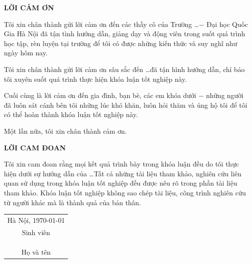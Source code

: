 \documentclass{uet}
\begin{document}
\pagebreak


\begin{titlepage}
    \begin{center}
        \bf{LỜI CẢM ƠN}
    \end{center}

    \par Tôi xin chân thành gửi lời cảm ơn đến các thầy cô của Trường \ldots $-$ Đại học Quốc Gia Hà Nội đã tận tình hướng dẫn, giảng dạy và động viên trong suốt quá trình học tập, rèn luyện tại trường để tôi có được những kiến thức và suy nghĩ như ngày hôm nay.
    
    \par Tôi xin chân thành gửi lời cảm ơn sâu sắc đến \ldots đã tận hình hướng dẫn, chỉ bảo tôi xuyên suốt quá trình thực hiện khóa luận tốt nghiệp này.
    
    \par Cuối cùng là lời cảm ơn đến gia đình, bạn bè, các em khóa dưới $-$ những người đã luôn sát cánh bên tôi những lúc khó khăn, luôn hỏi thăm và ủng hộ tôi để tôi có thể hoàn thành khóa luận tốt nghiệp này.
    
    \par Một lần nữa, tôi xin chân thành cảm ơn.
\end{titlepage}
\pagebreak
    
\begin{titlepage}
    \begin{center}
        \bf{LỜI CAM ĐOAN}
    \end{center}
    
    \par Tôi xin cam đoan rằng mọi kết quả trình bày trong khóa luận đều do tôi thực hiện dưới sự hướng dẫn của \ldots Tất cả những tài liệu tham khảo, nghiên cứu liên quan sử dụng trong khóa luận tốt nghiệp đều được nêu rõ trong phần tài liệu tham khảo. Khóa luận tốt nghiệp không sao chép tài liệu, công trình nghiên cứu từ người khác mà là thành quả của bản thân. 
    
    \begin{flushright}
        \begin{tabular}{@{}c@{}}
        Hà Nội, \MakeLowercase{\today}\\
        Sinh viên \\
        \\
        \\
        \\
        Họ và tên
        \end{tabular}
    \end{flushright}
\end{titlepage}
\end{document}
